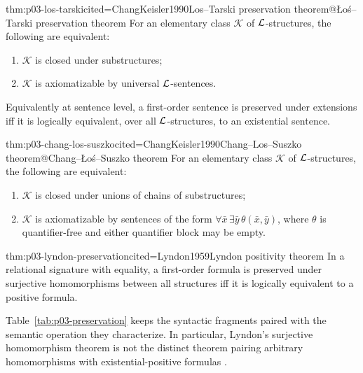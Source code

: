 \begin{hbtheorem}{thm:p03-los-tarski}{cited=ChangKeisler1990}{Los--Tarski preservation theorem@\L o\'s--Tarski preservation theorem}
For an elementary class \(\mathcal K\) of \(\mathcal{L}\)-structures, the following
are equivalent:
\begin{enumerate}
 \item \(\mathcal K\) is closed under substructures;
 \item \(\mathcal K\) is axiomatizable by universal \(\mathcal{L}\)-sentences.
\end{enumerate}
Equivalently at sentence level, a first-order sentence is preserved under
extensions iff it is logically equivalent, over all \(\mathcal{L}\)-structures, to
an existential sentence.
\end{hbtheorem}

\begin{hbtheorem}{thm:p03-chang-los-suszko}{cited=ChangKeisler1990}{Chang--Los--Suszko theorem@Chang--\L o\'s--Suszko theorem}
For an elementary class \(\mathcal K\) of \(\mathcal{L}\)-structures, the following
are equivalent:
\begin{enumerate}
 \item \(\mathcal K\) is closed under unions of chains of substructures;
 \item \(\mathcal K\) is axiomatizable by sentences of the form
       \(\forall\bar x\,\exists\bar y\,\theta(\bar x,\bar y)\), where
       \(\theta\) is quantifier-free and either quantifier block may be empty.
\end{enumerate}
\end{hbtheorem}

\begin{hbtheorem}{thm:p03-lyndon-preservation}{cited=Lyndon1959}{Lyndon positivity theorem}
In a relational signature with equality, a first-order formula is preserved
under surjective homomorphisms between all structures iff it is logically
equivalent to a positive formula.
\end{hbtheorem}

Table~\ref{tab:p03-preservation} keeps the syntactic fragments paired with the
semantic operation they characterize.  In particular, Lyndon's surjective
homomorphism theorem is not the distinct theorem pairing arbitrary
homomorphisms with existential-positive formulas
\cite{ChangKeisler1990,Lyndon1959}.

